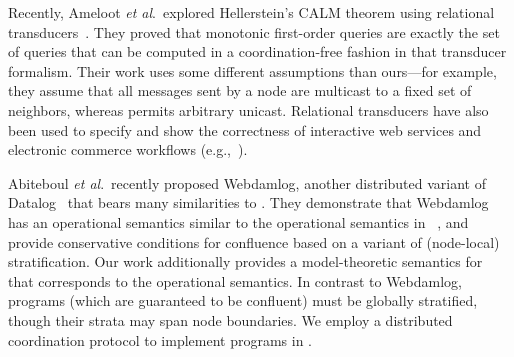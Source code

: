 Recently, Ameloot \emph{et al}.\ explored Hellerstein's CALM theorem using
relational transducers~\cite{relational-transducers}.  They proved that
monotonic first-order queries are exactly the set of queries that can be
computed in a coordination-free fashion in that transducer formalism.  Their
work uses some different assumptions than ours---for example, they assume that
all messages sent by a node are multicast to a fixed set of neighbors, whereas
\lang permits arbitrary unicast. Relational transducers have also been used to
specify and show the correctness of interactive web services and electronic
commerce workflows
(e.g.,~\cite{trans-ecommerce,deutsch-icdt,deutsch-web-app}).%

Abiteboul \emph{et al}.\ recently proposed Webdamlog, another distributed variant of
Datalog~\cite{Abiteboul2011} that bears many similarities to \lang.  They demonstrate that Webdamlog has an
operational semantics similar to the operational semantics in \lang~\cite{ameloot-operational},
and provide conservative conditions for confluence based on a variant of (node-local) stratification.
Our work additionally provides a model-theoretic semantics for \plang that corresponds to the operational semantics.  
In contrast to Webdamlog, \plang programs (which are guaranteed to be confluent) must be globally stratified, though their strata may span node boundaries.
We employ a distributed coordination protocol to implement \plang programs in \lang.



